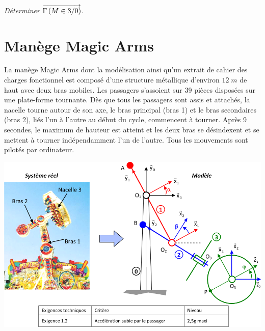 \documentclass[10pt,oneside]{article}
\begin{document}
\subparagraph{}
\textit{Déterminer $\overrightarrow{\Gamma \left( {M} \in {3}/{0}\right)}$.}


\section*{Manège Magic Arms } 
\setcounter{subparagraph}{0}

La manège Magic Arms dont la modélisation ainsi qu'un extrait de cahier des charges fonctionnel est composé d'une structure métallique d'environ $12\; m$ de haut avec deux bras mobiles. Les passagers s'assoient sur 39 pièces disposées sur une plate-forme tournante. Dès que tous les passagers sont assis et attachés, la nacelle tourne autour de son axe, le bras principal (bras 1) et le bras secondaires (bras 2), liés l'un à l'autre au début du cycle, commencent à tourner. Après 9 secondes, le maximum de hauteur est atteint et les deux bras se désindexent et se mettent à tourner indépendamment l'un de l'autre. Tous les mouvements sont pilotés par ordinateur. 

\begin{center}
\includegraphics[width=.9\textwidth]{png/img1}
\end{center}
\end{document}
